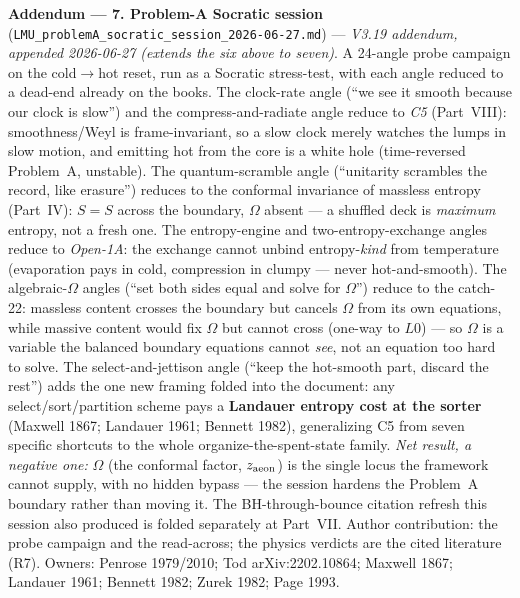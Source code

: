 \documentclass[11pt]{article}
\begin{document}
\smallskip\noindent\textbf{Addendum --- 7. Problem-A Socratic session} (\texttt{LMU\_problemA\_socratic\_session\_2026-06-27.md}) --- \emph{V3.19 addendum, appended 2026-06-27 (extends the six above to seven)}. A 24-angle probe campaign on the cold$\to$hot reset, run as a Socratic stress-test, with each angle reduced to a dead-end already on the books. The clock-rate angle (``we see it smooth because our clock is slow'') and the compress-and-radiate angle reduce to \emph{C5} (Part~VIII): smoothness/Weyl is frame-invariant, so a slow clock merely watches the lumps in slow motion, and emitting hot from the core is a white hole (time-reversed Problem~A, unstable). The quantum-scramble angle (``unitarity scrambles the record, like erasure'') reduces to the conformal invariance of massless entropy (Part~IV): $S=S$ across the boundary, $\Omega$ absent --- a shuffled deck is \emph{maximum} entropy, not a fresh one. The entropy-engine and two-entropy-exchange angles reduce to \emph{Open-1A}: the exchange cannot unbind entropy-\emph{kind} from temperature (evaporation pays in cold, compression in clumpy --- never hot-and-smooth). The algebraic-$\Omega$ angles (``set both sides equal and solve for $\Omega$'') reduce to the catch-22: massless content crosses the boundary but cancels $\Omega$ from its own equations, while massive content would fix $\Omega$ but cannot cross (one-way to $L0$) --- so $\Omega$ is a variable the balanced boundary equations cannot \emph{see}, not an equation too hard to solve. The select-and-jettison angle (``keep the hot-smooth part, discard the rest'') adds the one new framing folded into the document: any select/sort/partition scheme pays a \textbf{Landauer entropy cost at the sorter} (Maxwell 1867; Landauer 1961; Bennett 1982), generalizing C5 from seven specific shortcuts to the whole organize-the-spent-state family. \emph{Net result, a negative one:} $\Omega$ (the conformal factor, $z_{\rm aeon}$) is the single locus the framework cannot supply, with no hidden bypass --- the session hardens the Problem~A boundary rather than moving it. The BH-through-bounce citation refresh this session also produced is folded separately at Part~VII. Author contribution: the probe campaign and the read-across; the physics verdicts are the cited literature (R7). Owners: Penrose 1979/2010; Tod arXiv:2202.10864; Maxwell 1867; Landauer 1961; Bennett 1982; Zurek 1982; Page 1993.
\end{document}
